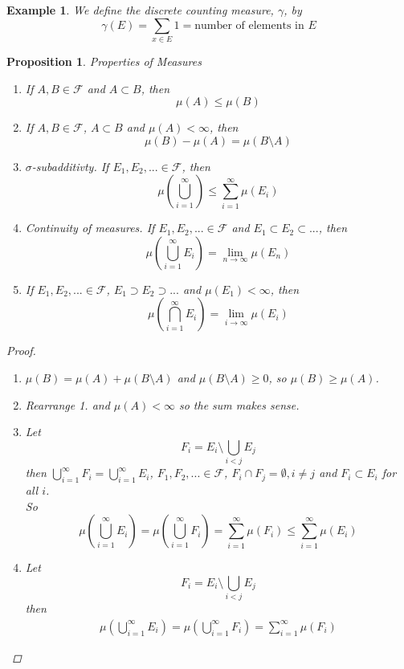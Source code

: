 \documentclass[12pt]{article}
\newtheorem{example}{Example}
\newtheorem{proposition}{Proposition}
\begin{document}
\begin{example} \label{E:Counting}
	We define the discrete counting measure, $\gamma$, by
	$$\gamma (E) = \sum_{x \in E} 1 = \text{number of elements in $E$}$$
\end{example}	

\begin{proposition} \label{P:PropertiesMeasures}
	\emph{Properties of Measures}
	\begin{enumerate}
		\item If $A, B \in \mathcal{F}$ and $A \subset B$, then
			$$\mu(A) \leq \mu(B)$$
		\item If $A, B \in \mathcal{F}$, $A \subset B$ and $\mu(A) < \infty$, then
			$$\mu(B) - \mu(A) = \mu(B \setminus A)$$
		\item \emph{$\sigma$-subadditivty}. If $E_1, E_2, ... \in \mathcal{F}$, then
			$$\mu(\bigcup_{i=1}^\infty) \le \sum_{i=1}^\infty \mu(E_i)$$
		\item \emph{Continuity of measures}. If $E_1, E_2, ... \in \mathcal{F}$ and $E_1 \subset E_2 \subset ...$, then
			$$\mu(\bigcup_{i=1}^\infty E_i) = \lim_{n \to \infty} \mu (E_n)$$
		\item If $E_1, E_2, ... \in \mathcal{F}$, $E_1 \supset E_2 \supset ...$ and $\mu(E_1) < \infty$, then 
			$$\mu(\bigcap_{i=1}^\infty E_i) = \lim_{i \to \infty} \mu(E_i)$$
	\end{enumerate}
	\begin{proof} \quad
		\begin{enumerate}
			\item $\mu(B) = \mu(A) + \mu(B \setminus A)$ and $\mu(B \setminus A) \ge 0$, so $\mu(B) \ge \mu(A)$.
			\item Rearrange 1. and $\mu(A) < \infty$ so the sum makes sense.
			\item Let 
			$$F_i = E_i \setminus \bigcup_{i < j} E_j$$
			then $\bigcup_{i=1}^\infty F_i = \bigcup_{i=1}^\infty E_i$, $F_1, F_2, ... \in \mathcal{F}$, $F_i \cap F_j = \emptyset, i \ne j$ and $F_i \subset E_i$ for all $i$.\\
			So
			$$\mu(\bigcup_{i=1}^\infty E_i) = \mu(\bigcup_{i=1}^\infty F_i) = \sum_{i=1}^\infty \mu(F_i) \le \sum_{i=1}^\infty \mu(E_i)$$
			\item Let 
			$$F_i = E_i \setminus \bigcup_{i < j} E_j$$
			then
			\begin{align*}
				\mu(\bigcup_{i=1}^\infty E_i)	= \mu(\bigcup_{i=1}^\infty F_i) %
				= \sum_{i=1}^\infty \mu(F_i) %

\end{align*}
\end{enumerate}
\end{proof}
\end{proposition}
\end{document}
